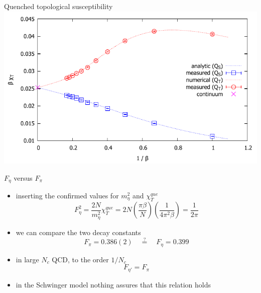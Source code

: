 \documentclass[english]{beamer}
\begin{document}
\begin{frame}{Quenched topological susceptibility}
  \includegraphics[width=1\textwidth]{figs/BeakDiagram}
\end{frame}

\begin{frame}{$F_\eta$ versus $F_\pi$}
  \begin{itemize}
    \item inserting the confirmed values for $m_\eta^2$
      and $\chi_T^{que}$ 
      \[
        F_{\eta}^2 = \frac{2N}{m_\eta^2}\chi_T^{que} =
          2N \left(\frac{\pi\beta}{N}\right)
          \left(\frac{1}{4\pi^2\beta}\right) =
          \frac{1}{2\pi}
      \]
    \item we can compare the two decay constants
      \[
        F_\pi = 0.386(2) \quad \overset{?}{=} \quad F_{\eta} = 0.399
      \]
    \item in large $N_c$ QCD, to the order $1/N_c$
      \[
        F_{\eta'} = F_\pi
      \]
    \item in the Schwinger model nothing assures that this relation 
      holds  
  \end{itemize}
\end{frame}
\end{document}
